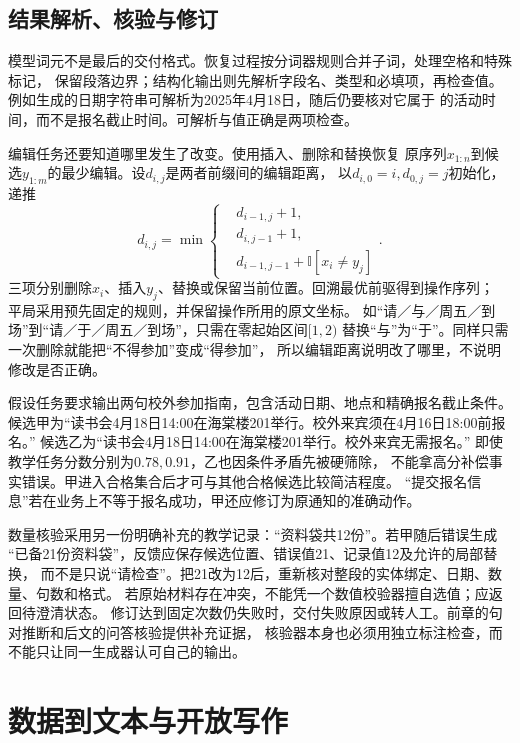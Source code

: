 \subsection{结果解析、核验与修订}
\label{sec:nlp-generation-recovery}

模型词元不是最后的交付格式。恢复过程按分词器规则合并子词，处理空格和特殊标记，
保留段落边界；结构化输出则先解析字段名、类型和必填项，再检查值。
例如生成的日期字符串可解析为2025年4月18日，随后仍要核对它属于
的活动时间，而不是报名截止时间。可解析与值正确是两项检查。

编辑任务还要知道哪里发生了改变。使用插入、删除和替换恢复
原序列$x_{1:n}$到候选$y_{1:m}$的最少编辑。设$d_{i,j}$是两者前缀间的编辑距离，
以$d_{i,0}=i,d_{0,j}=j$初始化，递推
\begin{equation}
  d_{i,j}=\min\left\{
  \begin{aligned}
    &d_{i-1,j}+1,\\
    &d_{i,j-1}+1,\\
    &d_{i-1,j-1}+\mathbb{I}[x_i\ne y_j]
  \end{aligned}\right. .
  \label{eq:nlp-generation-edit-distance}
\end{equation}
三项分别删除$x_i$、插入$y_j$、替换或保留当前位置。回溯最优前驱得到操作序列；
平局采用预先固定的规则，并保留操作所用的原文坐标。
如“请／与／周五／到场”到“请／于／周五／到场”，只需在零起始区间$[1,2)$
替换“与”为“于”。同样只需一次删除就能把“不得参加”变成“得参加”，
所以编辑距离说明改了哪里，不说明修改是否正确。

假设任务要求输出两句校外参加指南，包含活动日期、地点和精确报名截止条件。
候选甲为“读书会4月18日14:00在海棠楼201举行。校外来宾须在4月16日18:00前报名。”
候选乙为“读书会4月18日14:00在海棠楼201举行。校外来宾无需报名。”
即使教学任务分数分别为$0.78,0.91$，乙也因条件矛盾先被硬筛除，
不能拿高分补偿事实错误。甲进入合格集合后才可与其他合格候选比较简洁程度。
“提交报名信息”若在业务上不等于报名成功，甲还应修订为原通知的准确动作。

数量核验采用另一份明确补充的教学记录：“资料袋共12份”。若甲随后错误生成
“已备21份资料袋”，反馈应保存候选位置、错误值21、记录值12及允许的局部替换，
而不是只说“请检查”。把21改为12后，重新核对整段的实体绑定、日期、数量、句数和格式。
若原始材料存在冲突，不能凭一个数值校验器擅自选值；应返回待澄清状态。
修订达到固定次数仍失败时，交付失败原因或转人工。前章的句对推断和后文的问答核验提供补充证据，
核验器本身也必须用独立标注检查，而不能只让同一生成器认可自己的输出。

\section{数据到文本与开放写作}
\label{sec:nlp-generation-writing}

